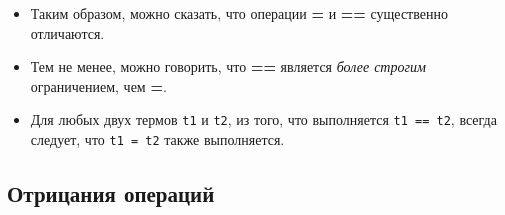 



\begin{frame}

	\frametitle{\insertsection}
	\framesubtitle{\insertsubsection}
	
	\begin{itemize}
			\item Таким образом, можно сказать, что операции \textbf{=} и \textbf{==} существенно отличаются.
			\item Тем не менее, можно говорить, что \textbf{==} является \textit{более строгим} ограничением, чем \textbf{=}.
			\item Для любых двух термов \texttt{t1} и \texttt{t2}, из того, что выполняется \texttt{t1 == t2}, всегда следует, что \texttt{t1 = t2} также выполняется.
	\end{itemize}

\end{frame}


\subsection{Отрицания операций}


